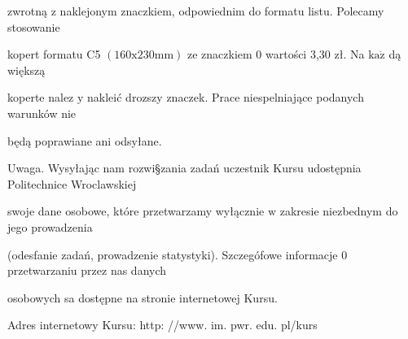 \documentclass[a4paper,12pt]{article}
\begin{document}
zwrotną $\mathrm{z}$ naklejonym znaczkiem, odpowiednim do formatu listu. Polecamy stosowanie

kopert formatu C5 $(160\mathrm{x}230\mathrm{m}\mathrm{m})$ ze znaczkiem $0$ wartości 3,30 zł. Na $\mathrm{k}\mathrm{a}\dot{\mathrm{z}}$ dą większą

koperte nalez $\mathrm{y}$ nakleić drozszy znaczek. Prace niespelniające podanych warunków nie

będą poprawiane ani odsyłane.

Uwaga. Wysyłając nam rozwi\S zania zadań uczestnik Kursu udostępnia Politechnice Wroclawskiej

swoje dane osobowe, które przetwarzamy wyłącznie $\mathrm{w}$ zakresie niezbednym do jego prowadzenia

(odesfanie zadań, prowadzenie statystyki). Szczegófowe informacje $0$ przetwarzaniu przez nas danych

osobowych sa dostępne na stronie internetowej Kursu.

Adres internetowy Kursu: http: //www. im. pwr. edu. pl/kurs
\end{document}
